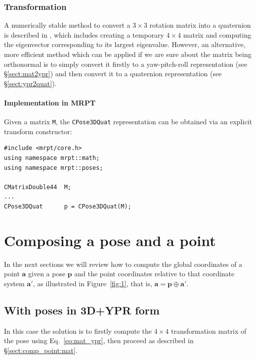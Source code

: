 \documentclass[a4paper,10pt]{report}
\begin{document}
\subsection{Transformation}

A numerically stable method to convert a $3 \times 3$ rotation matrix into a quaternion is
described in \cite{bar2000new}, which includes creating a temporary $4 \times 4$ matrix and 
computing the eigenvector corresponding to its largest eigenvalue. 
However, an alternative, more efficient method which can be applied if we are sure about 
the matrix being orthonormal is to simply convert it firstly to a yaw-pitch-roll representation 
(see \S \ref{sect:mat2ypr}) and then convert it 
to a quaternion representation (see \S \ref{sect:ypr2quat}).

 
\subsubsection{Implementation in MRPT}

Given a matrix \texttt{M}, the \texttt{CPose3DQuat} representation can be obtained via
an explicit transform constructor:

\begin{lstlisting}
#include <mrpt/core.h> 
using namespace mrpt::math; 
using namespace mrpt::poses; 

CMatrixDouble44  M;
...
CPose3DQuat      p = CPose3DQuat(M);
\end{lstlisting}





\chapter{Composing a pose and a point}

In the next sections we will review how to compute the global coordinates of a point $\mathbf{a}$
given a pose $\mathbf{p}$ and the point coordinates relative to that coordinate system $\mathbf{a'}$,
as illustrated in Figure~\ref{fig:1}, that is, $\mathbf{a} = \mathbf{p} \oplus \mathbf{a'}$.

\section{With poses in 3D+YPR form}

In this case the solution is to firstly compute the $4 \times 4$ 
transformation matrix of the pose using Eq.~\ref{eq:mat_ypr}, then proceed 
as described in \S \ref{sect:comp_point:mat}.
\end{document}
